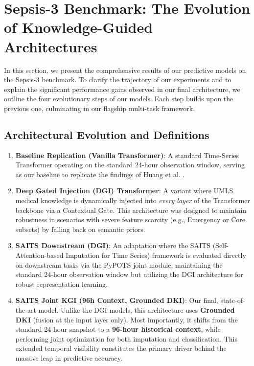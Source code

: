 \section{Sepsis-3 Benchmark: The Evolution of Knowledge-Guided Architectures}
\label{sec:sepsis_results}

In this section, we present the comprehensive results of our predictive models on the Sepsis-3 benchmark. To clarify the trajectory of our experiments and to explain the significant performance gains observed in our final architecture, we outline the four evolutionary steps of our models. Each step builds upon the previous one, culminating in our flagship multi-task framework.

\subsection{Architectural Evolution and Definitions}
\begin{enumerate}
    \item \textbf{Baseline Replication (Vanilla Transformer)}: A standard Time-Series Transformer operating on the standard 24-hour observation window, serving as our baseline to replicate the findings of Huang et al. \cite{huang2025}.
    \item \textbf{Deep Gated Injection (DGI) Transformer}: A variant where UMLS medical knowledge is dynamically injected into \textit{every layer} of the Transformer backbone via a Contextual Gate. This architecture was designed to maintain robustness in scenarios with severe feature scarcity (e.g., Emergency or Core subsets) by falling back on semantic priors.
    \item \textbf{SAITS Downstream (DGI)}: An adaptation where the SAITS (Self-Attention-based Imputation for Time Series) framework is evaluated directly on downstream tasks via the PyPOTS joint module, maintaining the standard 24-hour observation window but utilizing the DGI architecture for robust representation learning.
    \item \textbf{SAITS Joint KGI (96h Context, Grounded DKI)}: Our final, state-of-the-art model. Unlike the DGI models, this architecture uses \textbf{Grounded DKI} (fusion at the input layer only). Most importantly, it shifts from the standard 24-hour snapshot to a \textbf{96-hour historical context}, while performing joint optimization for both imputation and classification. This extended temporal visibility constitutes the primary driver behind the massive leap in predictive accuracy.
\end{enumerate}

